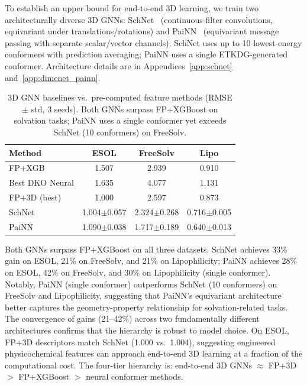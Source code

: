 \documentclass[sigconf]{acmart}
\newcommand{\rev}[1]{#1}
\begin{document}
To establish an upper bound for end-to-end 3D learning, we train \rev{two architecturally diverse} 3D GNNs: SchNet~\cite{schutt2017schnet} (continuous-filter convolutions, equivariant under translations/rotations) \rev{and PaiNN~\cite{schutt2021painn} (equivariant message passing with separate scalar/vector channels)}. SchNet uses up to 10 lowest-energy conformers with prediction averaging; \rev{PaiNN uses a single ETKDG-generated conformer}. Architecture details are in Appendices~\ref{app:schnet} and~\ref{app:dimenet_painn}.

\begin{table}[!htb]
\caption{3D GNN baselines vs.\ pre-computed feature methods (RMSE $\pm$ std, 3 seeds). \rev{Both GNNs surpass FP+XGBoost on solvation tasks; PaiNN uses a single conformer yet exceeds SchNet (10 conformers) on FreeSolv.}}
\label{tab:schnet}
\centering
\small
\begin{tabular}{@{}lccc@{}}
\toprule
Method & ESOL & FreeSolv & Lipo \\
\midrule
FP+XGB           & 1.507 & 2.939 & 0.910 \\
Best DKO Neural  & 1.635 & 4.077 & 1.131 \\
FP+3D (best)     & 1.000 & 2.597 & 0.873 \\
\midrule
SchNet~\cite{schutt2017schnet}   & 1.004$\pm$0.057 & 2.324$\pm$0.268 & 0.716$\pm$0.005 \\
\rev{PaiNN~\cite{schutt2021painn}}     & \rev{1.090$\pm$0.038} & \rev{1.717$\pm$0.189} & \rev{0.640$\pm$0.013} \\
\bottomrule
\end{tabular}
\end{table}

\rev{Both GNNs surpass FP+XGBoost on all three datasets. SchNet achieves 33\% gain on ESOL, 21\% on FreeSolv, and 21\% on Lipophilicity; PaiNN achieves 28\% on ESOL, 42\% on FreeSolv, and 30\% on Lipophilicity (single conformer). Notably, PaiNN (single conformer) outperforms SchNet (10 conformers) on FreeSolv and Lipophilicity, suggesting that PaiNN's equivariant architecture better captures the geometry-property relationship for solvation-related tasks. The convergence of gains (21--42\%) across two fundamentally different architectures confirms that the hierarchy is robust to model choice.} On ESOL, FP+3D descriptors match SchNet (1.000 vs.\ 1.004), suggesting engineered physicochemical features can approach end-to-end 3D learning at a fraction of the computational cost. The four-tier hierarchy is: end-to-end 3D GNNs $\approx$ FP+3D $>$ FP+XGBoost $>$ neural conformer methods.
\end{document}
